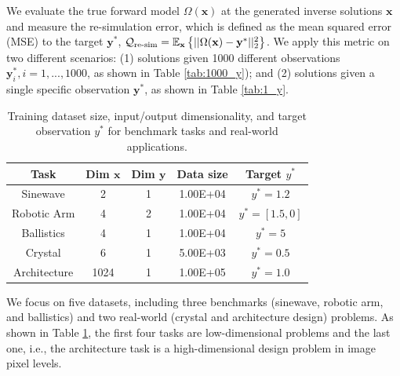\documentclass[letterpaper]{article} %
\begin{document}
 We evaluate the true forward model $\Omega(\mathbf{x})$ at the generated inverse solutions $\mathbf{x}$ and measure the re-simulation error, which is defined as the mean squared error (MSE) to the target $\mathbf{y}^*$, $\mathcal{Q}_{\textup{re-sim}} = \mathbb{E}_{\mathbf{x}}\left\{ ||\Omega(\mathbf{x}) - \mathbf{y}^*||_2^2 \right\}$.
We apply this metric on two different scenarios: (1) solutions given 1000 different observations $\mathbf{y}_i^*, i=1,...,1000$, as shown in Table \ref{tab:1000_y}); and (2) solutions given a single specific observation $\mathbf{y}^*$, as shown in Table \ref{tab:1_y}.
\begin{table}[h!]
\footnotesize
\centering
\caption{Training dataset size, input/output dimensionality, and target observation $y^*$ for benchmark tasks and real-world applications.}
\label{tab:dataset}
\begin{tabular}{@{}ccccc@{}}
\toprule
Task        & Dim $\mathbf{x}$ & Dim $\mathbf{y}$ & Data size & Target  $y^*$ \\ \midrule
Sinewave        & 2     & 1         & 1.00E+04  & $y^*=1.2$     \\
Robotic Arm & 4     & 2         & 1.00E+04 & $y^*=[1.5,0]$     \\
Ballistics  & 4     & 1          & 1.00E+04 & $y^*=5$     \\
Crystal     & 6     & 1          & 5.00E+03  & $y^*=0.5$    \\
Architecture     & 1024     & 1          & 1.00E+05  & $y^*=1.0$    \\
\bottomrule
\end{tabular}
\end{table}

 We focus on five datasets, including three benchmarks (sinewave, robotic arm, and ballistics) and two real-world (crystal and architecture design) problems. As shown in Table \ref{tab:dataset}, the first four tasks are low-dimensional problems and the last one, i.e., the architecture task is a high-dimensional design problem in image pixel levels.
\end{document}

